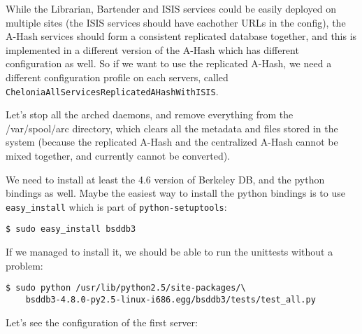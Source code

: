 \documentclass{article}
\begin{document}
While the Librarian, Bartender and ISIS services could be easily deployed on multiple sites (the ISIS services should have eachother URLs in the config), the A-Hash services should form a consistent replicated database together, and this is implemented in a different version of the A-Hash which has different configuration as well. So if we want to use the replicated A-Hash, we need a different configuration profile on each servers, called \verb!CheloniaAllServicesReplicatedAHashWithISIS!.

Let's stop all the arched daemons, and remove everything from the /var/spool/arc directory, which clears all the metadata and files stored in the system (because the replicated A-Hash and the centralized A-Hash cannot be mixed together, and currently cannot be converted).

We need to install at least the 4.6 version of Berkeley DB, and the python bindings as well. Maybe the easiest way to install the python bindings is to use \verb!easy_install! which is part of \verb!python-setuptools!:

\begin{verbatim}
$ sudo easy_install bsddb3    
\end{verbatim}

If we managed to install it, we should be able to run the unittests without a problem:

\begin{verbatim}
$ sudo python /usr/lib/python2.5/site-packages/\
    bsddb3-4.8.0-py2.5-linux-i686.egg/bsddb3/tests/test_all.py
\end{verbatim}

Let's see the configuration of the first server:
\end{document}
